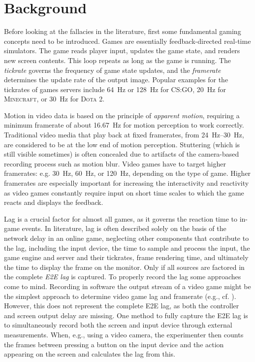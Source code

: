 \section{Background}
\label{sec:background}

Before looking at the fallacies in the literature, first some fundamental gaming concepts need to be introduced. Games are essentially feedback-directed real-time simulators. The game reads player input, updates the game state, and renders new screen contents. This loop repeats as long as the game is running. The \textit{tickrate} governs the frequency of game state updates, and the \textit{framerate} determines the update rate of the output image. Popular examples for the tickrates of games servers include \SI{64}{\hertz} or \SI{128}{\hertz} for \textsc{CS:GO}, \SI{20}{\hertz} for \textsc{Minecraft}, or \SI{30}{\hertz} for \textsc{Dota 2}.

Motion in video data is based on the principle of \textit{apparent motion}, requiring a minimum framerate of about \SI{16.67}{\hertz} for motion perception to work correctly. Traditional video media that play back at fixed framerates, from \SIrange{24}{30}{\hertz}, are considered to be at the low end of motion perception. Stuttering (which is still visible sometimes) is often concealed due to artifacts of the camera-based recording process such as motion blur. Video games have to target higher framerates: e.g. \SI{30}{\hertz}, \SI{60}{\hertz}, or \SI{120}{\hertz}, depending on the type of game. Higher framerates are especially important for increasing the interactivity and reactivity as video games constantly require input on short time scales to which the game reacts and displays the feedback.

Lag is a crucial factor for almost all games, as it governs the reaction time to in-game events. In literature, lag is often described solely on the basis of the network delay in an online game, neglecting other components that contribute to the lag, including the input device, the time to sample and process the input, the game engine and server and their tickrates, frame rendering time, and ultimately the time to display the frame on the monitor. Only if all sources are factored in the complete \textit{\gls{E2E} lag} is captured. To properly record the lag some approaches come to mind. Recording in software the output stream of a video game might be the simplest approach to determine video game lag and framerate (e.g., cf. \cite{Chen:2011:MLC:2072298.2071991}). However, this does not represent the complete \gls{E2E} lag, as both the controller and screen output delay are missing. One method to fully capture the \gls{E2E} lag is to simultaneously record both the screen and input device through external measurements. When, e.g., using a video camera, the experimenter then counts the frames between pressing a button on the input device and the action appearing on the screen and calculates the lag from this.
